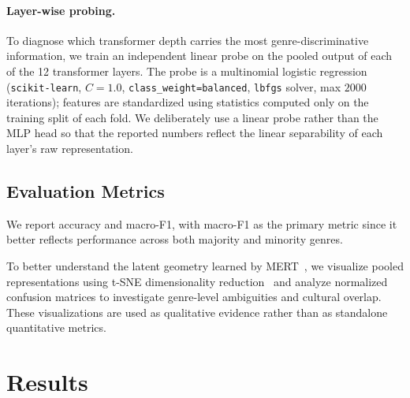 \documentclass{article}
\begin{document}
\paragraph{Layer-wise probing.}
To diagnose which transformer depth carries the most genre-discriminative
information, we train an independent linear probe on the pooled output of
each of the 12 transformer layers. The probe is a multinomial logistic
regression (\texttt{scikit-learn}, $C\!=\!1.0$, \texttt{class\_weight=balanced},
\texttt{lbfgs} solver, max $2000$ iterations); features are standardized using
statistics computed only on the training split of each fold. We deliberately
use a linear probe rather than the MLP head so that the reported numbers
reflect the linear separability of each layer's raw representation.


\subsection{Evaluation Metrics}

We report accuracy and macro-F1, with macro-F1 as the primary metric since it better reflects performance across both majority and minority genres.

To better understand the latent geometry learned by MERT~\cite{li2024mert}, we visualize pooled representations using t-SNE dimensionality reduction~\cite{maaten2008visualizing} and analyze normalized confusion matrices to investigate genre-level ambiguities and cultural overlap. These visualizations are used as qualitative evidence rather than as standalone quantitative metrics.

\section{Results}
\end{document}
